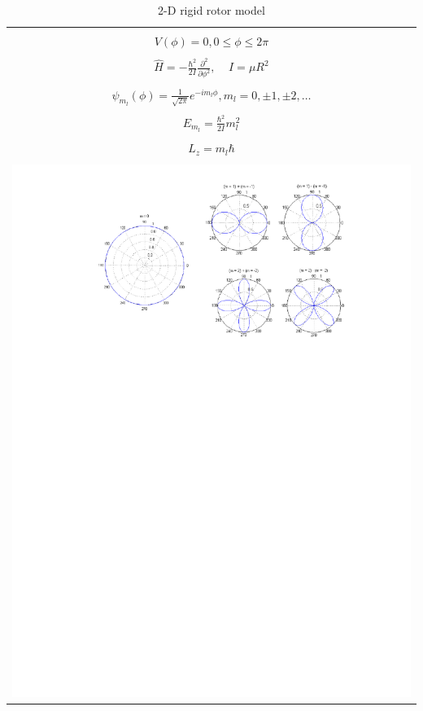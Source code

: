 \documentclass[11pt]{article}
\begin{document}
\begin{table}[tbh]
   \begin{center}
   \caption{2-D rigid rotor model}
    \label{Rigid rotor}
\begin{tabular}[h]{|c|}
\hline
 \\
$\displaystyle       V(\phi) = 0, 0 \leq \phi \leq 2\pi $ \\
 \\
$\displaystyle \hat H = -\frac{\hbar^2}{2 I} \frac{\partial^2}{\partial
  \phi^2},\ \ \ \ \ I=\mu R^2
$\\
\\
$\displaystyle     \psi_{m_l}(\phi) = \frac{1}{\sqrt{2\pi}} e^{-i m_l \phi}, m_l
= 0, \pm 1, \pm 2, \ldots $ \\
\\
$\displaystyle     E_{m_l}=\frac{\hbar^2}{2 I}m_l^2$ \\
 \\
$\displaystyle L_z = m_l \hbar$ \\
\\
     \includegraphics[scale=1]{Images/2Drotor.pdf} \\       
\hline
\end{tabular}
 \end{center}
\end{table}
\end{document}

